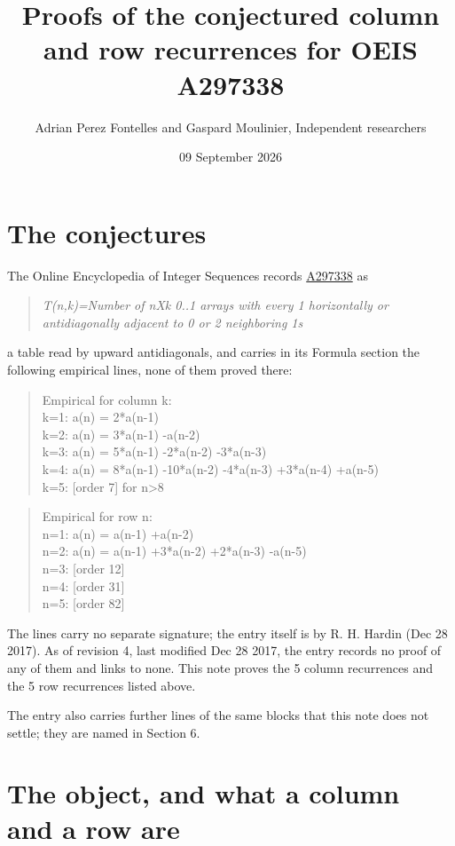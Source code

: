 \documentclass[11pt]{article}
\title{Proofs of the conjectured column and row recurrences for OEIS A297338}
\author{Adrian Perez Fontelles and Gaspard Moulinier, Independent researchers}
\date{09 September 2026}
\theoremstyle{definition}
\begin{document}
\maketitle
\section{The conjectures}

The Online Encyclopedia of Integer Sequences records \href{https://oeis.org/A297338}{A297338} as

\begin{quote}\itshape T(n,k)=Number of nXk 0..1 arrays with every 1 horizontally or antidiagonally adjacent to 0 or 2 neighboring 1s\end{quote}

a table read by upward antidiagonals, and carries in its Formula section the following empirical lines, none of them proved there:

\begin{quote}\ttfamily Empirical for column k:\\
k=1: a(n) = 2*a(n-1)\\k=2: a(n) = 3*a(n-1) -a(n-2)\\k=3: a(n) = 5*a(n-1) -2*a(n-2) -3*a(n-3)\\k=4: a(n) = 8*a(n-1) -10*a(n-2) -4*a(n-3) +3*a(n-4) +a(n-5)\\k=5: [order 7] for n>8\end{quote}

\begin{quote}\ttfamily Empirical for row n:\\
n=1: a(n) = a(n-1) +a(n-2)\\n=2: a(n) = a(n-1) +3*a(n-2) +2*a(n-3) -a(n-5)\\n=3: [order 12]\\n=4: [order 31]\\n=5: [order 82]\end{quote}

The lines carry no separate signature; the entry itself is by R. H. Hardin (Dec 28 2017). As of revision 4, last modified Dec 28 2017, the entry records no proof of any of them and links to none. This note proves the 5 column recurrences and the 5 row recurrences listed above.

The entry also carries further lines of the same blocks that this note does not settle; they are named in Section 6.

\section{The object, and what a column and a row are}
\end{document}
